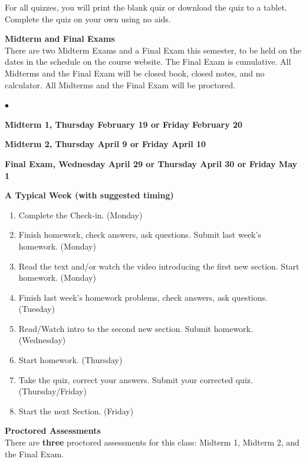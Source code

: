 \documentclass[12pt]{article}
\renewcommand{\emph}[1]{\textsf{\textbf{#1}}}
\newcommand{\localhead}[1]{\par\smallskip\textbf{#1} \smallskip\nobreak\\}%
\def\heading#1{\localhead{\large\emph{#1}}}
\newenvironment{clist}%
{\bgroup\parskip 0pt\begin{list}{$\bullet$}{\partopsep 4pt\topsep 0pt\itemsep -2pt}}%
{\end{list}\egroup}%
\begin{document}
For all quizzes, you will print the blank quiz or download the quiz to a tablet. Complete the quiz on your own using no aids. 

\clearpage\newpage
\phantom{x}
\vspace{-4mm}

\heading{Midterm and Final Exams}
There are two Midterm Exams and a Final Exam this semester, to be held on the dates in the schedule on the course website. The Final Exam is cumulative. All Midterms and the Final Exam will be closed book, closed notes, and no calculator. All Midterms and the Final Exam will be proctored.\\

\begin{clist}
\item \emph{Midterm 1, Thursday February 19 or Friday February 20}
\item \emph{Midterm 2, Thursday April 9 or Friday April 10}
\item  \emph{Final Exam, Wednesday April 29 or Thursday April 30 or Friday May 1}
\end{clist} 

\heading{A Typical Week (with suggested timing)}
\vspace*{-.2in}
\begin{enumerate}
\item Complete the Check-in. (Monday)
\item Finish homework, check answers, ask questions. Submit last week's homework. (Monday) 
\item Read the text and/or watch the video introducing the first new section. Start homework. (Monday)
\item Finish last week's homework problems, check answers, ask questions.  (Tuesday)
\item Read/Watch intro to the second new section. Submit homework. (Wednesday)
\item Start homework. (Thursday)
\item Take the quiz, correct your answers. Submit your corrected quiz.  (Thursday/Friday)
\item Start the next Section. (Friday)
\end{enumerate}

\heading{Proctored Assessments}
There are \emph{three} proctored assessments for this class:
Midterm 1, Midterm 2, and the Final Exam. 
\end{document}
